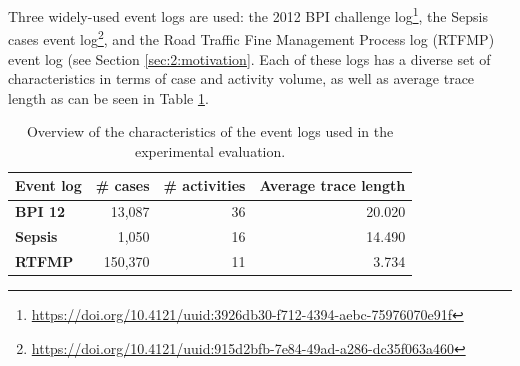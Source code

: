 Three widely-used event logs are used: the 2012 BPI challenge log\footnote{\url{https://doi.org/10.4121/uuid:3926db30-f712-4394-aebc-75976070e91f}}, the Sepsis cases event log\footnote{\url{https://doi.org/10.4121/uuid:915d2bfb-7e84-49ad-a286-dc35f063a460}}, and the Road Traffic Fine Management Process log (RTFMP) event log (see Section \ref{sec:2:motivation}.
Each of these logs has a diverse set of characteristics in terms of case and activity volume, as well as average trace length as can be seen in Table \ref{tab:eventlogs}.
\begin{table}[htbp]
  \centering
    \begin{tabular}{lrrr}
    \toprule
    \textbf{Event log} & \multicolumn{1}{l}{\textbf{\# cases}} & \multicolumn{1}{l}{\textbf{\# activities}} & \multicolumn{1}{l}{\textbf{Average trace length}} \\
    \midrule
    \textbf{BPI 12} & 13,087 & 36    & 20.020 \\
    \textbf{Sepsis} & 1,050 & 16    & 14.490 \\
    \textbf{RTFMP} & 150,370 & 11    & 3.734 \\
    \bottomrule
    \end{tabular}%
  \caption{Overview of the characteristics of the event logs used in the experimental evaluation.}
  \label{tab:eventlogs}%
\end{table}%

